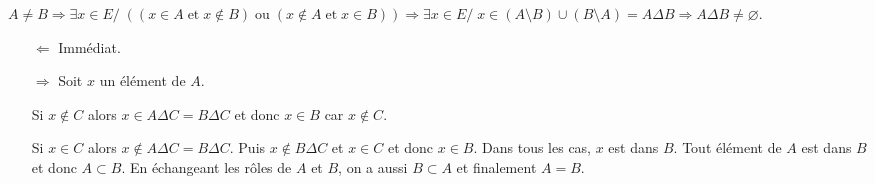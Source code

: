 {\begin{enumerate}
{$A\neq B\Rightarrow\exists x\in E/\;((x\in A\;\mbox{et}\;x\notin B)\;\mbox{ou}\;(x\notin A\;\mbox{et}\;
x\in B))\Rightarrow\exists x\in E/\;x\in(A\setminus B)\cup(B\setminus A)=A\Delta B\Rightarrow A\Delta B\neq\varnothing$.
\begin{itemize}
\item[$\Leftarrow$] Immédiat.
\item[$\Rightarrow$] Soit $x$ un élément de $A$.

Si $x\notin C$ alors $x\in A\Delta C=B\Delta C$ et donc $x\in B$ car $x\notin C$.

Si $x\in C$ alors $x\notin A\Delta C=B\Delta C$. Puis $x\notin B\Delta C$ et $x\in C$ et donc $x\in B$. Dans tous les
cas, $x$ est dans $B$. Tout élément de $A$ est dans $B$ et donc $A\subset B$.
En échangeant les rôles de $A$ et $B$, on a aussi $B\subset A$ et finalement $A=B$.
\end{itemize}
}
\end{enumerate}
}
